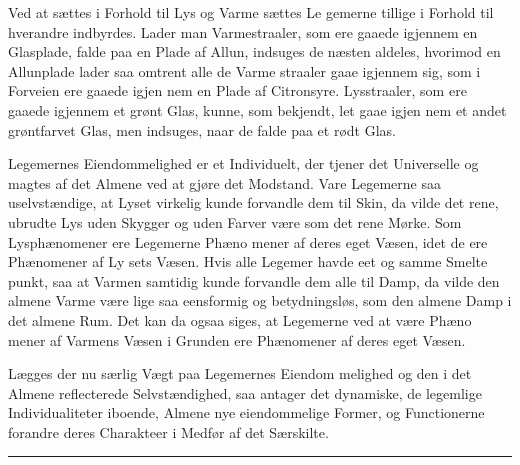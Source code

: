 \documentclass[12pt,a4paper]{book}
\newcommand{\streg}{\begin{center}\rule{2cm}{0.4pt}\end{center}}
\begin{document}
Ved at sættes i Forhold til Lys og Varme sættes Le\-%
gemerne tillige i Forhold til hverandre indbyrdes. Lader man
Varmestraaler, som ere gaaede igjennem en Glasplade, falde paa en Plade
af Allun, indsuges de næsten aldeles, hvorimod en Allunplade lader saa
omtrent alle de Varme\-%
straaler gaae igjennem sig, som i Forveien ere gaaede igjen\-%
nem en Plade af Citronsyre. Lysstraaler, som ere gaaede igjennem et
grønt Glas, kunne, som bekjendt, let gaae igjen\-%
nem et andet grøntfarvet Glas, men indsuges, naar de falde paa et rødt
Glas.

Legemernes Eiendommelighed er et Individuelt, der tjener det
Universelle og magtes af det Almene ved at gjøre det Modstand. Vare
Legemerne saa uselvstændige, at Lyset virkelig kunde forvandle dem til
Skin, da vilde det rene, ubrudte Lys uden Skygger og uden Farver være
som det rene Mørke. Som Lysphænomener ere Legemerne Phæno\-%
mener af deres eget Væsen, idet de ere Phænomener af Ly\-%
sets Væsen. Hvis alle Legemer havde eet og samme Smelte\-%
punkt, saa at Varmen samtidig kunde forvandle dem alle til Damp, da
vilde den almene Varme være lige saa eensformig og betydningsløs, som
den almene Damp i det almene Rum. Det kan da ogsaa siges, at Legemerne
ved at være Phæno\-%
mener af Varmens Væsen i Grunden ere Phænomener af deres eget Væsen.

Lægges der nu særlig Vægt paa Legemernes Eiendom\-%
melighed og den i det Almene reflecterede Selvstændighed, saa antager
det dynamiske, de legemlige Individualiteter iboende, Almene nye
eiendommelige Former, og Functionerne forandre deres Charakteer i
Medfør af det Særskilte.

\streg
\end{document}
